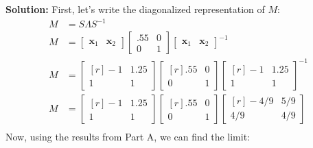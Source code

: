 \documentclass[10pt]{amsart}
\begin{document}
\textbf{Solution:} First, let's write the diagonalized representation of $M$: 
\begin{align*}
M &= S \Lambda S^{-1} \\
M &= \left[\begin{matrix}
\mathbf{x}_1 & \mathbf{x}_2
\end{matrix}\right] 
\left[\begin{matrix}
.55 & 0 \\ 0 & 1
\end{matrix}\right]
\left[\begin{matrix}
\mathbf{x}_1 & \mathbf{x}_2
\end{matrix}\right]^{-1} \\
%
%
M &=\left[\begin{matrix*}[r]
-1 & 1.25 \\ 1 & 1
\end{matrix*}\right] 
\left[\begin{matrix*}[r]
.55 & 0 \\ 0 & 1
\end{matrix*}\right]
\left[\begin{matrix*}[r]
-1 & 1.25 \\ 1 & 1
\end{matrix*}\right]^{-1} \\
%
%
M &=\left[\begin{matrix*}[r]
-1 & 1.25 \\ 1 & 1
\end{matrix*}\right] 
\left[\begin{matrix*}[r]
.55 & 0 \\ 0 & 1
\end{matrix*}\right]
\left[\begin{matrix*}[r]
-4/9 & 5/9 \\ 4/9 & 4/9
\end{matrix*}\right] \\
\end{align*}
Now, using the results from Part A, we can find the limit:
\end{document}
